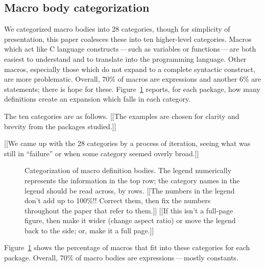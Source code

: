 \documentclass[10pt]{article}
\begin{document}
\subsection{Macro body categorization}

We categorized macro bodies into 28 categories, though for simplicity of
presentation, this paper coalesces these into ten higher-level categories.
Macros which act like C language constructs\,---\,such as variables or
functions\,---\,are both easiest to understand and to translate into the
programming language.  Other macros, especially those which do not expand
to a complete syntactic construct, are more problematic.  Overall, 70\% of
macros are expressions and another 6\% are statements; there is hope for these.
Figure~\ref{fig:categorization} reports, for each package, how many
definitions create an expansion which falls in each category.

The ten categories are as follows.  [[The examples are chosen for clarity
and brevity from the packages studied.]]

[[We came up with the 28 categories by a process of iteration, seeing what
was still in ``failure'' or when some category seemed overly broad.]]


\begin{figure}
\centerline{}
\caption{Categorization of macro definition bodies.  The legend numerically
  represents the information in the top row; the category names in the
  legend should be read across, by rows.  [[The numbers in the
  legend don't add up to 100\%!!  Correct them, then fix the numbers
  throughout the paper that refer to them.]]
  [[If this isn't a full-page figure, then make it wider (change aspect
  ratio) or move the legend back to the side; or, make it a full page.]]}
\label{fig:categorization}
\end{figure}


\label{sec:categorization}


{}

Figure~\ref{fig:categorization} shows the percentage of macros that fit
into these categories for each package.  Overall, 70\% of macro bodies are
expressions\,---\,mostly constants.
\end{document}
